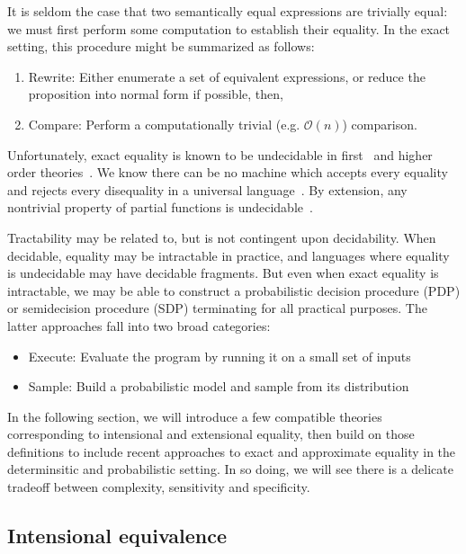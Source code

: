 \documentclass[11pt]{article}
\begin{document}
    It is seldom the case that two semantically equal expressions are trivially equal: we must first perform some computation to establish their equality. In the exact setting, this procedure might be summarized as follows:

    \begin{enumerate}
        \item Rewrite: Either enumerate a set of equivalent expressions, or reduce the proposition into normal form if possible, then,
        \item Compare: Perform a computationally trivial (e.g. $\mathcal{O}(n)$) comparison.
    \end{enumerate}

    Unfortunately, exact equality is known to be undecidable in first~\cite{godel1929vollstandigkeit} and higher order theories~\cite{godel1931formal}. We know there can be no machine which accepts every equality and rejects every disequality in a universal language~\cite{turing1937computable}. By extension, any nontrivial property of partial functions is undecidable~\cite{rice1953classes}.

    Tractability may be related to, but is not contingent upon decidability. When decidable, equality may be intractable in practice, and languages where equality is undecidable may have decidable fragments. But even when exact equality is intractable, we may be able to construct a probabilistic decision procedure (PDP) or semidecision procedure (SDP) terminating for all practical purposes. The latter approaches fall into two broad categories:

    \begin{itemize}
        \item Execute: Evaluate the program by running it on a small set of inputs
        \item Sample: Build a probabilistic model and sample from its distribution
    \end{itemize}

    In the following section, we will introduce a few compatible theories corresponding to intensional and extensional equality, then build on those definitions to include recent approaches to exact and approximate equality in the determinsitic and probabilistic setting. In so doing, we will see there is a delicate tradeoff between complexity, sensitivity and specificity.

    \subsection{Intensional equivalence}\label{subsec:in-eq}
\end{document}
